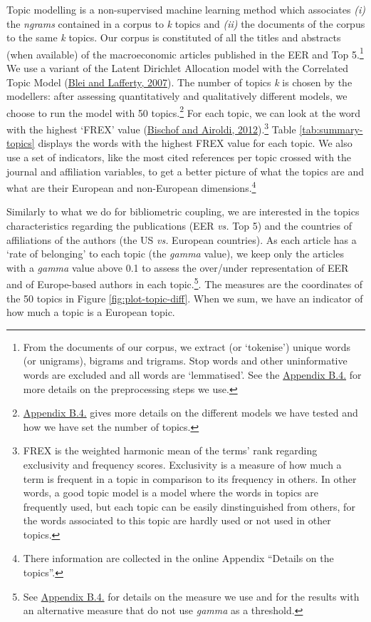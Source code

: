 \documentclass[
]{article}
\begin{document}
Topic modelling is a non-supervised machine learning method which
associates \emph{(i)} the \emph{ngrams} contained in a corpus to
\emph{k} topics and \emph{(ii)} the documents of the corpus to the same
\emph{k} topics. Our corpus is constituted of all the titles and
abstracts (when available) of the macroeconomic articles published in
the EER and Top 5.\footnote{From the documents of our corpus, we extract
  (or `tokenise') unique words (or unigrams), bigrams and trigrams. Stop
  words and other uninformative words are excluded and all words are
  `lemmatised'. See the \protect\hyperlink{topic}{Appendix B.4.} for
  more details on the preprocessing steps we use.} We use a variant of
the Latent Dirichlet Allocation model with the Correlated Topic Model
(\protect\hyperlink{ref-blei2007}{Blei and Lafferty, 2007}). The number
of topics \emph{k} is chosen by the modellers: after assessing
quantitatively and qualitatively different models, we choose to run the
model with 50 topics.\footnote{\protect\hyperlink{topic}{Appendix B.4.}
  gives more details on the different models we have tested and how we
  have set the number of topics.} For each topic, we can look at the
word with the highest `FREX' value
(\protect\hyperlink{ref-bischof2012}{Bischof and Airoldi,
2012}).\footnote{FREX is the weighted harmonic mean of the terms' rank
  regarding exclusivity and frequency scores. Exclusivity is a measure
  of how much a term is frequent in a topic in comparison to its
  frequency in others. In other words, a good topic model is a model
  where the words in topics are frequently used, but each topic can be
  easily dinstinguished from others, for the words associated to this
  topic are hardly used or not used in other topics.} Table
\ref{tab:summary-topics} displays the words with the highest FREX value
for each topic. We also use a set of indicators, like the most cited
references per topic crossed with the journal and affiliation variables,
to get a better picture of what the topics are and what are their
European and non-European dimensions.\footnote{There information are
  collected in the online Appendix ``Details on the topics''.}

Similarly to what we do for bibliometric coupling, we are interested in
the topics characteristics regarding the publications (EER \emph{vs.}
Top 5) and the countries of affiliations of the authors (the US
\emph{vs.} European countries). As each article has a `rate of
belonging' to each topic (the \emph{gamma} value), we keep only the
articles with a \emph{gamma} value above 0.1 to assess the over/under
representation of EER and of Europe-based authors in each
topic.\footnote{See \protect\hyperlink{topic}{Appendix B.4.} for details
  on the measure we use and for the results with an alternative measure
  that do not use \emph{gamma} as a threshold.}. The measures are the
coordinates of the 50 topics in Figure \ref{fig:plot-topic-diff}. When
we sum, we have an indicator of how much a topic is a European topic.
\end{document}
